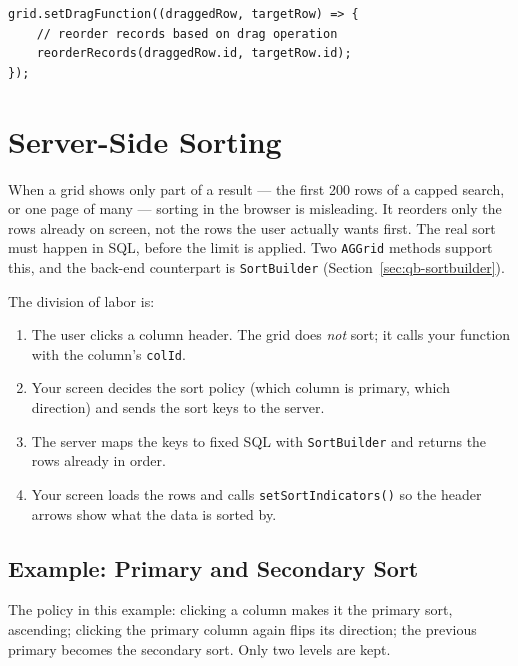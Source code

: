 \begin{lstlisting}[style=javascript]
grid.setDragFunction((draggedRow, targetRow) => {
    // reorder records based on drag operation
    reorderRecords(draggedRow.id, targetRow.id);
});
\end{lstlisting}

\section{Server-Side Sorting}
\label{sec:grid-serversort}

When a grid shows only part of a result --- the first 200 rows of a capped search, or one page of many --- sorting in the browser is misleading.  It reorders only the rows already on screen, not the rows the user actually wants first.  The real sort must happen in SQL, before the limit is applied.  Two \texttt{AGGrid} methods support this, and the back-end counterpart is \texttt{SortBuilder} (Section~\ref{sec:qb-sortbuilder}).

The division of labor is:

\begin{enumerate}
  \item The user clicks a column header.  The grid does \emph{not} sort; it calls your function with the column's \texttt{colId}.
  \item Your screen decides the sort policy (which column is primary, which direction) and sends the sort keys to the server.
  \item The server maps the keys to fixed SQL with \texttt{SortBuilder} and returns the rows already in order.
  \item Your screen loads the rows and calls \texttt{setSortIndicators()} so the header arrows show what the data is sorted by.
\end{enumerate}

\subsection{Example: Primary and Secondary Sort}

The policy in this example: clicking a column makes it the primary sort, ascending; clicking the primary column again flips its direction; the previous primary becomes the secondary sort.  Only two levels are kept.

